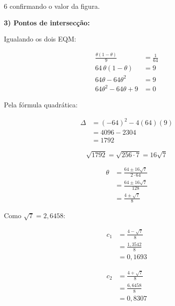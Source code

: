 \documentclass[8pt, a4paper, landscape]{extarticle}
\begin{document}
\begin{multicols}{6}
confirmando o valor da figura.

\vspace{0.2cm}

\textbf{3) Pontos de intersecção:}

Igualando os dois EQM:

\begin{equation*}
\begin{split}
\frac{\theta(1-\theta)}{9} &= \frac{1}{64} \\
64\,\theta(1-\theta) &= 9 \\
64\theta - 64\theta^2 &= 9 \\
64\theta^2 - 64\theta + 9 &= 0
\end{split}
\end{equation*}

Pela fórmula quadrática:

\begin{equation*}
\begin{split}
\Delta &= (-64)^2 - 4(64)(9) \\
&= 4096 - 2304 \\
&= 1792
\end{split}
\end{equation*}

\begin{equation*}
\sqrt{1792} = \sqrt{256 \cdot 7} = 16\sqrt{7}
\end{equation*}

\begin{equation*}
\begin{split}
\theta &= \frac{64 \pm 16\sqrt{7}}{2 \cdot 64} \\
&= \frac{64 \pm 16\sqrt{7}}{128} \\
&= \frac{4 \pm \sqrt{7}}{8}
\end{split}
\end{equation*}

Como $\sqrt{7} = 2,6458$:

\begin{equation*}
\begin{split}
c_1 &= \frac{4 - \sqrt{7}}{8} \\
&= \frac{1,3542}{8} \\
&= 0,1693
\end{split}
\end{equation*}

\begin{equation*}
\begin{split}
c_2 &= \frac{4 + \sqrt{7}}{8} \\
&= \frac{6,6458}{8} \\
&= 0,8307
\end{split}
\end{equation*}


\end{multicols}
\end{document}
